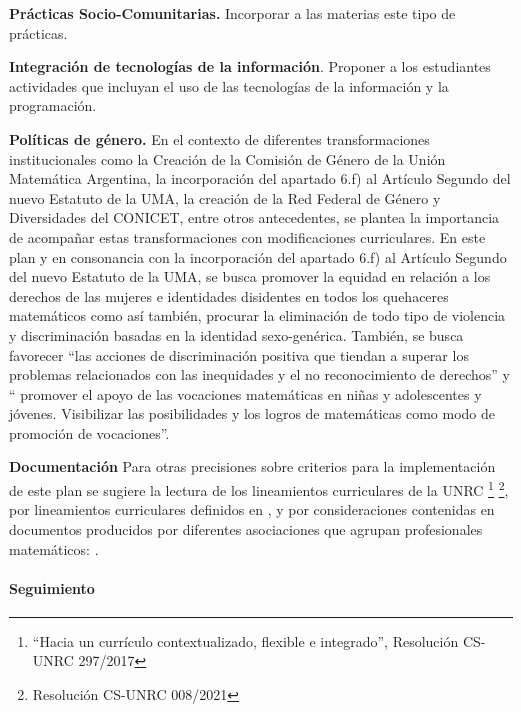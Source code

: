 \documentclass[a4paper, 12pt]{article}
\begin{document}
\begin{description}
\item{\textbf{Prácticas Socio-Comunitarias.} } Incorporar a las materias este tipo de prácticas.


\item{ \textbf{Integración de tecnologías de la información}.} Proponer a los estudiantes actividades que incluyan el uso de las tecnologías de la información y la programación.  



\item{\textbf{Políticas de género.}}
En el contexto de diferentes transformaciones institucionales como la Creación de la Comisión de Género de la Unión Matemática Argentina, la incorporación del apartado 6.f) al Artículo Segundo del nuevo Estatuto de la UMA, la creación de la Red Federal de Género y Diversidades del CONICET, entre otros antecedentes, se plantea la importancia de acompañar estas transformaciones con  modificaciones curriculares. 
En este plan y en consonancia con la incorporación del apartado 6.f) al Artículo Segundo del nuevo Estatuto de la UMA, se  busca promover la equidad en relación a los derechos de las mujeres e identidades disidentes en todos los quehaceres matemáticos  como así también,  procurar la eliminación de todo tipo de violencia y discriminación basadas en la identidad sexo-genérica.
También, se busca favorecer “las acciones de discriminación positiva que tiendan a superar los problemas relacionados con las inequidades y el no reconocimiento de derechos”  y    “ promover el apoyo de las vocaciones matemáticas en niñas y adolescentes y jóvenes. Visibilizar las posibilidades y los logros de matemáticas como modo de promoción de vocaciones”.
 
 \item{\textbf{Documentación}} Para otras precisiones sobre criterios para la implementación de este plan se sugiere la lectura de los lineamientos curriculares de la UNRC \footnote{``Hacia   un   currículo contextualizado, flexible e integrado'', Resolución CS-UNRC 297/2017 }
\footnote{ Resolución CS-UNRC 008/2021}, por lineamientos curriculares definidos en  \cite{paniagua2013educacion}, y por consideraciones contenidas en documentos producidos por diferentes asociaciones que agrupan profesionales matemáticos: \cite{uma,society1996siam,society2012siam,damlamian2013educational}.

\end{description}


\paragraph{Seguimiento} 
\end{document}
